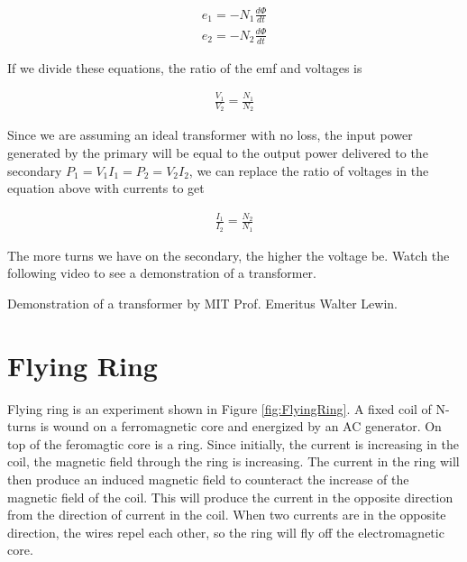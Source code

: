\documentclass{ximera}
\begin{document}
\begin{eqnarray}
e_1=-N_1 \frac{d\Phi}{dt} \\
e_2=-N_2 \frac{d\Phi}{dt}
\end{eqnarray}

If we divide these equations, the ratio of the emf and voltages is

\begin{eqnarray}
\frac{V_1}{V_2}=\frac{N_1}{N_2} 
\end{eqnarray}


Since we are assuming an ideal transformer with no loss, the input power generated by the primary will be equal to the output power delivered to the secondary $P_1=V_1 I_1= P_2 = V_2 I_2$, we can replace the ratio of voltages in the equation above with currents to get


\begin{eqnarray}
\frac{I_1}{I_2}=\frac{N_2}{N_1} 
\end{eqnarray}





The more turns we have on the secondary, the higher the voltage be. Watch the following video to see a demonstration of a transformer.

\begin{example}


Demonstration of a transformer by MIT Prof. Emeritus Walter Lewin.
\begin{center}  
\end{center} 

\end{example}


\section{Flying Ring}

Flying ring is an experiment shown in Figure \ref{fig:FlyingRing}. A fixed coil of N-turns is wound on a ferromagnetic core and energized by an AC generator. On top of the feromagtic core is a ring. Since initially, the current is increasing in the coil, the magnetic field through the ring is increasing. The current in the ring will then produce an induced magnetic field to counteract the increase of the magnetic field of the coil. This will produce the current in the opposite direction from the direction of current in the coil. When two currents are in the opposite direction, the wires repel each other, so the ring will fly off the electromagnetic core. 
\end{document}
